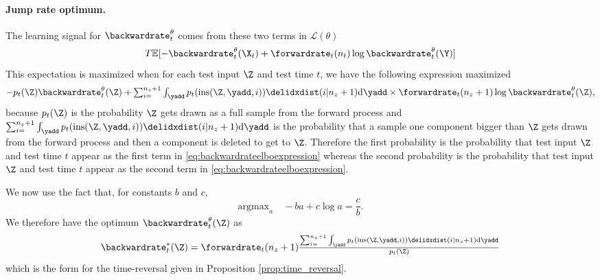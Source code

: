 \paragraph{Jump rate optimum.} The learning signal for $\backwardrate_{t}^\theta$ comes from these two terms in $\mathcal{L}(\theta)$
\begin{equation}
    T \mathbb{E}[ - \backwardrate_t^\theta(\X_t) + \forwardrate_t(n_t) \log \backwardrate_t^\theta(\Y) ]
    \label{eq:backwardrateelboexpression}
\end{equation}
This expectation is maximized when for each test input $\Z$ and test time $t$, we have the following expression maximized
\begin{equation}
  \textstyle 
    -p_t(\Z) \backwardrate_t^\theta(\Z) + \sum_{i=}^{n_z+1} \int_{\yadd} p_t(\text{ins}(\Z, \yadd, i)) \delidxdist(i | n_z + 1) \rmd \yadd \times \forwardrate_t(n_z + 1) \log \backwardrate_t^\theta(\Z) , 
\end{equation}
because $p_t(\Z)$ is the probability $\Z$ gets drawn as a full sample from the forward process and $\sum_{i=}^{n_z+1} \int_{\yadd} p_t(\text{ins}(\Z, \yadd, i)) \delidxdist(i | n_z + 1) \rmd \yadd $ is the probability that a sample one component bigger than $\Z$ gets drawn from the forward process and then a component is deleted to get to $\Z$. Therefore the first probability is the probability that test input $\Z$ and test time $t$ appear as the first term in \eqref{eq:backwardrateelboexpression} whereas the second probability is the probability that test input $\Z$ and test time $t$ appear as the second term in \eqref{eq:backwardrateelboexpression}.

We now use the fact that, for constants $b$ and $c$,
\begin{equation}
    \textstyle \mathrm{argmax}_a \quad -ba + c \log a = \frac{c}{b}.
    \label{eq:log_minimizer}
\end{equation}
We therefore have the optimum $\backwardrate_t^\theta(\Z)$ as
\begin{equation}
\textstyle    \backwardrate_t^*(\Z) = \forwardrate_t(n_z + 1) \frac{\sum_{i=}^{n_z+1} \int_{\yadd} p_t(\text{ins}(\Z, \yadd, i)) \delidxdist(i | n_z + 1) \rmd \yadd}{ p_t(\Z) }
\end{equation}
which is the form for the time-reversal given in Proposition \eqref{prop:time_reversal}.\\

